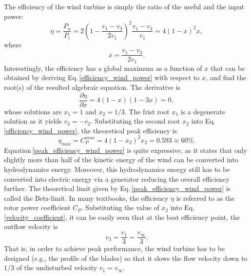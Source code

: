 The efficiency of the wind turbine is simply the ratio of the useful and the input power:
%
\begin{equation} \label{efficiency_wind_power}
\eta = \frac{P_u}{P_i} = 2 \left( 1 - \frac{v_1-v_3}{2 v_1} \right)^2 \frac{v_1-v_3}{v_1} = 4 (1-x)^2 x,
\end{equation}
%
where
%
\begin{equation} \label{velocity_coefficient}
x = \frac{v_1-v_3}{2 v_1}.
\end{equation}
%
Interestingly, the efficiency has a global maximum as a function of $x$ that can be obtained by deriving Eq.\,\eqref{efficiency_wind_power} with respect to $x$, and find the root(s) of the resulted algebraic equation. The derivative is
%
\begin{equation}
\frac{\partial \eta}{\partial x} = 4 (1-x) (1-3x) = 0,
\end{equation}
%
whose solutions are $x_1=1$ and $x_2=1/3$. The frist root $x_1$ is a degenerate solution as it yields $v_3=-v_2$. Substituting the second root $x_2$ into Eq.\,\eqref{efficiency_wind_power}, the theoretical peak efficiency is
%
\begin{equation} \label{peak_efficiency_wind_power}
\eta_{max} = C_P^{max} = 4 (1-x_2)^2 x_2 = 0.593 \approx 60\%.
\end{equation}
%
Equation\,\eqref{peak_efficiency_wind_power} is quite expressive, as it states that only slightly more than half of the kinetic energy of the wind can be converted into hydrodynamics energy. Moreover, this hydrodynamics energy still has to be converted into electric energy via a generator reducing the overall efficiency further. The theoretical limit given by Eq.\,\eqref{peak_efficiency_wind_power} is called the Betz-limit. In many textbooks, the efficiency $\eta$ is referred to as the rotor power coefficient $C_P$. Substituting the value of $x_2$ into Eq.\,\eqref{velocity_coefficient}, it can be easily seen that at the best efficiency point, the outflow velocity is
%
\begin{equation}
v_3 = \frac{v_1}{3} = \frac{v_{\infty}}{3}.
\end{equation}
%
That is, in order to achieve peak performance, the wind turbine has to be designed (e.g., the profile of the blades) so that it slows the flow velocity down to $1/3$ of the undisturbed velocity $v_1=v_{\infty}$.


